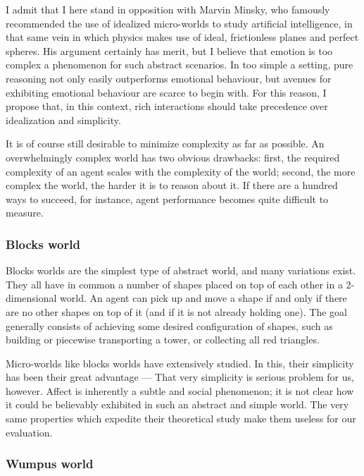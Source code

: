 I admit that I here stand in opposition with Marvin Minsky, who famously recommended the use of idealized micro-worlds to study artificial intelligence, in that same vein in which physics makes use of ideal, frictionless planes and perfect spheres. His argument certainly has merit, but I believe that emotion is too complex a phenomenon for such abstract scenarios. In too simple a setting, pure reasoning not only easily outperforms emotional behaviour, but avenues for exhibiting emotional behaviour are scarce to begin with. For this reason, I propose that, in this context, rich interactions should take precedence over idealization and simplicity.

It is of course still desirable to minimize complexity as far as possible. An overwhelmingly complex world has two obvious drawbacks: first, the required complexity of an agent scales with the complexity of the world; second, the more complex the world, the harder it is to reason about it. If there are a hundred ways to succeed, for instance, agent performance becomes quite difficult to measure.

\subsubsection{Blocks world}

Blocks worlds are the simplest type of abstract world, and many variations exist. They all have in common a number of shapes placed on top of each other in a 2-dimensional world. An agent can pick up and move a shape if and only if there are no other shapes on top of it (and if it is not already holding one). The goal generally consists of achieving some desired configuration of shapes, such as building or piecewise transporting a tower, or collecting all red triangles. 

Micro-worlds like blocks worlds have extensively studied. In this, their simplicity has been their great advantage --- That very simplicity is serious problem for us, however. Affect is inherently a subtle and social phenomenon; it is not clear how it could be believably exhibited in such an abstract and simple world. The very same properties which expedite their theoretical study make them useless for our evaluation.


\subsubsection{Wumpus world}


